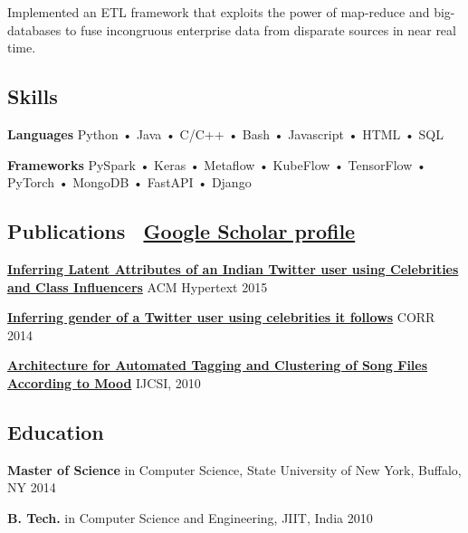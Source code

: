 \documentclass[11pt,letterpaper]{article}
\newcommand{\normalsizesection}{\normalsize}
\newcommand{\smallersection}{\small}
\newcommand{\tinyfootnote}{\fontsize{8pt}{9pt}\selectfont} %
\newcommand{\sectionbox}[1]{%
    \vspace{0.2em}
    \begin{tcolorbox}[
        colback=sectionbg,
        colframe=sectionbg,
        width=\textwidth,
        left=5pt,
        right=5pt,
        top=2pt,
        bottom=2pt,
        boxrule=0pt,
        arc=0pt,
        boxsep=0pt,
    ]
    \section*{#1}
    \end{tcolorbox}
    \vspace{-0.3em}
}
\newenvironment{projectdesc}{%
    \leftskip=1.0cm
    \footnotesize
    \par\noindent
}{\par\leftskip=0cm\smallersection\vspace{-3pt}}
\newcommand{\iconlink}[3]{%
    #1~\href{#2}{#3}%
}
\begin{document}
\begin{projectdesc}
    Implemented an ETL framework that exploits the power of map-reduce and big-databases to fuse incongruous enterprise data from disparate sources in near real time.
\end{projectdesc}

\normalsizesection

\vspace{30pt} %

\sectionbox{Skills}
\smallersection

\noindent\textbf{Languages} \hspace{2mm} Python • Java • C/C++ • Bash • Javascript • HTML • SQL

\vspace{1pt}
\noindent\textbf{Frameworks} \hspace{0.5mm} PySpark • Keras • Metaflow • KubeFlow • TensorFlow • PyTorch • MongoDB • FastAPI • Django

\normalsizesection

\sectionbox{Publications \hfill \normalsize\iconlink{\faGraduationCap}{https://scholar.google.com/citations?user=NrYKcaMAAAAJ\&hl=en}{Google Scholar profile}}
\tinyfootnote %

\noindent\textbf{\href{http://dl.acm.org/citation.cfm?id=2806657}{Inferring Latent Attributes of an Indian Twitter user using Celebrities and Class Influencers}} \hfill \href{https://www.youtube.com/watch?v=9BtWs3Rn2Ng}{\faYoutube} ACM Hypertext 2015

\vspace{-1pt}
\noindent\textbf{\href{http://arxiv.org/abs/1405.6667}{Inferring gender of a Twitter user using celebrities it follows}} \hfill CORR 2014

\vspace{-1pt}
\noindent\textbf{\href{http://arxiv.org/abs/1206.2484}{Architecture for Automated Tagging and Clustering of Song Files According to Mood}} \hfill IJCSI, 2010

\normalsizesection

\sectionbox{Education}
\smallersection

\noindent\textbf{Master of Science} in Computer Science, State University of New York, Buffalo, NY \hfill 2014

\vspace{-1pt}
\noindent\textbf{B. Tech.} in Computer Science and Engineering, JIIT, India \hfill 2010
\end{document}
